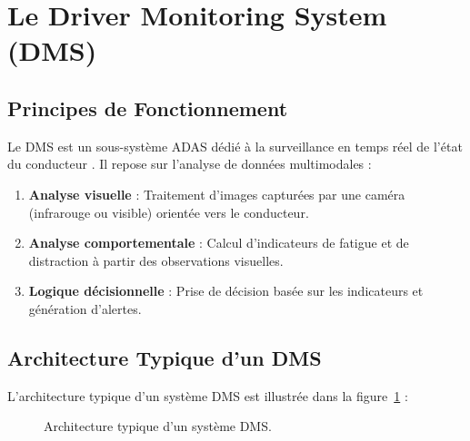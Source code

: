 \documentclass[12pt,a4paper,twoside]{report}
\begin{document}
\section{Le Driver Monitoring System (DMS)}

\subsection{Principes de Fonctionnement}

Le DMS est un sous-système ADAS dédié à la surveillance en temps réel de l'état du conducteur \cite{dinion2019}. Il repose sur l'analyse de données multimodales :

\begin{enumerate}[leftmargin=2cm]
    \item \textbf{Analyse visuelle} : Traitement d'images capturées par une caméra (infrarouge ou visible) orientée vers le conducteur.
    \item \textbf{Analyse comportementale} : Calcul d'indicateurs de fatigue et de distraction à partir des observations visuelles.
    \item \textbf{Logique décisionnelle} : Prise de décision basée sur les indicateurs et génération d'alertes.
\end{enumerate}

\subsection{Architecture Typique d'un DMS}

L'architecture typique d'un système DMS est illustrée dans la figure~\ref{fig:dms_archi_typique} :

\begin{figure}[H]
\centering
{}
\caption{Architecture typique d'un système DMS.}
\label{fig:dms_archi_typique}
\end{figure}
\end{document}
